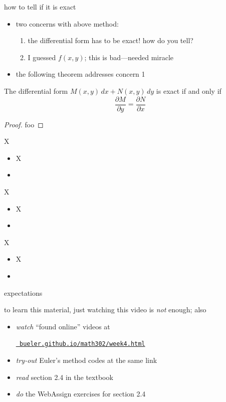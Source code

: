 \documentclass{beamer}
\begin{document}
\begin{frame}{how to tell if it is exact}

\begin{itemize}
\item two concerns with above method:
    \begin{enumerate}
    \item the differential form has to be exact!  how do you tell?
    \item I guessed $f(x,y)$; this is bad---needed miracle
    \end{enumerate}
\item the following theorem addresses concern 1
\end{itemize}

\begin{theorem}
The differential form $M(x,y)\,dx + N(x,y)\,dy$ is exact if and only if
    $$\frac{\partial M}{\partial y} = \frac{\partial N}{\partial x}$$
\end{theorem}

\begin{proof}
foo
\end{proof}
\end{frame}


\begin{frame}{X}

\begin{itemize}
\item X
\item 
\end{itemize}
\end{frame}


\begin{frame}{X}

\begin{itemize}
\item X
\item 
\end{itemize}
\end{frame}


\begin{frame}{X}

\begin{itemize}
\item X
\item 
\end{itemize}
\end{frame}


\begin{frame}{expectations}

to learn this material, just watching this video is \emph{not} enough; also
\begin{itemize}
\item \emph{watch} ``found online'' videos at

\centerline{\href{https://bueler.github.io/math302/week4.html}{\tt \color{cyan} bueler.github.io/math302/week4.html}}
\item \emph{try-out} Euler's method codes at the same link
\item \emph{read} section 2.4 in the textbook
\item \emph{do} the WebAssign exercises for section 2.4
\end{itemize}
\end{frame}
\end{document}
